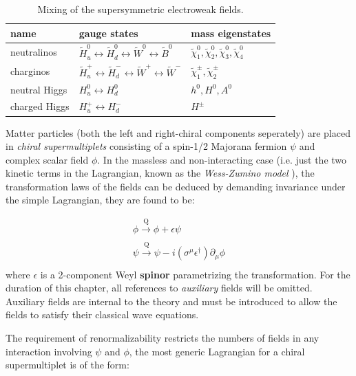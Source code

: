 \begin{table}
\caption{Mixing of the supersymmetric electroweak fields.}
\label{tab:mixing}
\centering
\begin{tabular}{lll}
\hline
\hline
name & gauge states & mass eigenstates \\
\hline
neutralinos & $\widetilde{H}_{u}^{0} \leftrightarrow \widetilde{H}_{d}^{0} \leftrightarrow \widetilde{W}^{0} \leftrightarrow \widetilde{B}^{0}$ & $\tilde{\chi}^{0}_{1}, \tilde{\chi}^{0}_{2}, \tilde{\chi}^{0}_{3}, \tilde{\chi}^{0}_{4}$ \\
charginos & $\widetilde{H}_{u}^{+} \leftrightarrow \widetilde{H}_{d}^{-} \leftrightarrow \widetilde{W}^{+} \leftrightarrow \widetilde{W}^{-}$ & $\tilde{\chi}^{\pm}_{1}, \tilde{\chi}^{\pm}_{2}$ \\
neutral Higgs & ${H}_{u}^{0} \leftrightarrow {H}_{d}^{0}$ & $h^{0}, H^{0}, A^{0}$\\
charged Higgs & ${H}_{u}^{+} \leftrightarrow {H}_{d}^{-}$ & $H^{\pm}$\\
\hline
\hline
\end{tabular}
\end{table}

Matter particles (both the left and right-chiral components seperately) are placed in \textit{chiral supermultiplets} consisting of a spin-1/2 Majorana fermion $\psi$ and complex scalar field $\phi$. In the massless and non-interacting case (i.e. just the two kinetic terms in the Lagrangian, known as the \textit{Wess-Zumino model} \cite{wesszumino}), the transformation laws of the fields can be deduced by demanding invariance under the simple Lagrangian, they are found to be:
 
\begin{equation}
\begin{array}{l}
\phi \xrightarrow[]{\text{Q}} \phi + \epsilon \psi \\
\psi \xrightarrow[]{\text{Q}} \psi - i ( \sigma^{\mu} \epsilon^{\dagger} ) \partial_{\mu} \phi \\
\end{array}
\end{equation}
where $\epsilon$ is a 2-component Weyl \textbf{spinor} parametrizing the transformation. For the duration of this chapter, all references to \textit{auxiliary} fields will be omitted. Auxiliary fields are internal to the theory and must be introduced to allow the fields to satisfy their classical wave equations.

The requirement of renormalizability restricts the numbers of fields in any interaction involving $\psi$ and $\phi$, the most generic Lagrangian for a chiral supermultiplet is of the form:

